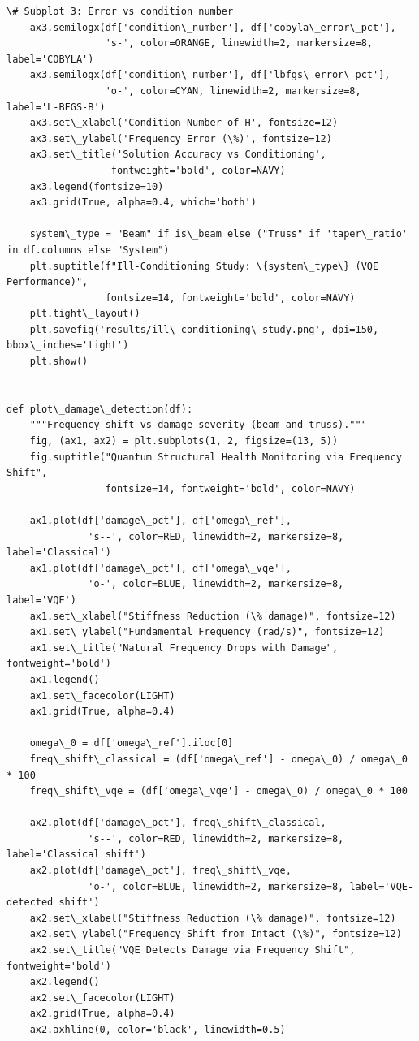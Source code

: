 \documentclass[12pt, a4paper]{article}
\begin{document}
\begin{lstlisting}[style=codestyle, caption={{visualize.py --- Beam and Truss Visualizations}}]
    \# Subplot 3: Error vs condition number
    ax3.semilogx(df['condition\_number'], df['cobyla\_error\_pct'],
                 's-', color=ORANGE, linewidth=2, markersize=8, label='COBYLA')
    ax3.semilogx(df['condition\_number'], df['lbfgs\_error\_pct'],
                 'o-', color=CYAN, linewidth=2, markersize=8, label='L-BFGS-B')
    ax3.set\_xlabel('Condition Number of H', fontsize=12)
    ax3.set\_ylabel('Frequency Error (\%)', fontsize=12)
    ax3.set\_title('Solution Accuracy vs Conditioning',
                  fontweight='bold', color=NAVY)
    ax3.legend(fontsize=10)
    ax3.grid(True, alpha=0.4, which='both')

    system\_type = "Beam" if is\_beam else ("Truss" if 'taper\_ratio' in df.columns else "System")
    plt.suptitle(f"Ill-Conditioning Study: \{system\_type\} (VQE Performance)",
                 fontsize=14, fontweight='bold', color=NAVY)
    plt.tight\_layout()
    plt.savefig('results/ill\_conditioning\_study.png', dpi=150, bbox\_inches='tight')
    plt.show()


def plot\_damage\_detection(df):
    """Frequency shift vs damage severity (beam and truss)."""
    fig, (ax1, ax2) = plt.subplots(1, 2, figsize=(13, 5))
    fig.suptitle("Quantum Structural Health Monitoring via Frequency Shift",
                 fontsize=14, fontweight='bold', color=NAVY)

    ax1.plot(df['damage\_pct'], df['omega\_ref'],
              's--', color=RED, linewidth=2, markersize=8, label='Classical')
    ax1.plot(df['damage\_pct'], df['omega\_vqe'],
              'o-', color=BLUE, linewidth=2, markersize=8, label='VQE')
    ax1.set\_xlabel("Stiffness Reduction (\% damage)", fontsize=12)
    ax1.set\_ylabel("Fundamental Frequency (rad/s)", fontsize=12)
    ax1.set\_title("Natural Frequency Drops with Damage", fontweight='bold')
    ax1.legend()
    ax1.set\_facecolor(LIGHT)
    ax1.grid(True, alpha=0.4)

    omega\_0 = df['omega\_ref'].iloc[0]
    freq\_shift\_classical = (df['omega\_ref'] - omega\_0) / omega\_0 * 100
    freq\_shift\_vqe = (df['omega\_vqe'] - omega\_0) / omega\_0 * 100

    ax2.plot(df['damage\_pct'], freq\_shift\_classical,
              's--', color=RED, linewidth=2, markersize=8, label='Classical shift')
    ax2.plot(df['damage\_pct'], freq\_shift\_vqe,
              'o-', color=BLUE, linewidth=2, markersize=8, label='VQE-detected shift')
    ax2.set\_xlabel("Stiffness Reduction (\% damage)", fontsize=12)
    ax2.set\_ylabel("Frequency Shift from Intact (\%)", fontsize=12)
    ax2.set\_title("VQE Detects Damage via Frequency Shift", fontweight='bold')
    ax2.legend()
    ax2.set\_facecolor(LIGHT)
    ax2.grid(True, alpha=0.4)
    ax2.axhline(0, color='black', linewidth=0.5)


\end{lstlisting}
\end{document}
